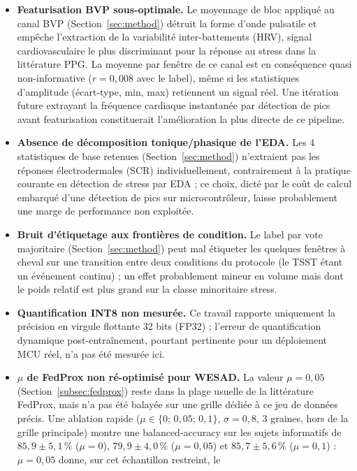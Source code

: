 \documentclass{acmart}
\begin{document}
\begin{itemize}
  \item \textbf{Featurisation BVP sous-optimale.} Le moyennage de bloc
  appliqué au canal BVP (Section~\ref{sec:method}) détruit la forme d'onde
  pulsatile et empêche l'extraction de la variabilité inter-battements
  (HRV), signal cardiovasculaire le plus discriminant pour la réponse au
  stress dans la littérature PPG. La moyenne par fenêtre de ce canal est en
  conséquence quasi non-informative ($r=0{,}008$ avec le label), même si les
  statistiques d'amplitude (écart-type, min, max) retiennent un signal réel.
  Une itération future extrayant la fréquence cardiaque instantanée par
  détection de pics avant featurisation constituerait l'amélioration la
  plus directe de ce pipeline.
  \item \textbf{Absence de décomposition tonique/phasique de l'EDA.} Les 4
  statistiques de base retenues (Section~\ref{sec:method}) n'extraient pas
  les réponses électrodermales (SCR) individuellement, contrairement à la
  pratique courante en détection de stress par EDA ; ce choix, dicté par le
  coût de calcul embarqué d'une détection de pics sur microcontrôleur,
  laisse probablement une marge de performance non exploitée.
  \item \textbf{Bruit d'étiquetage aux frontières de condition.} Le
  label par vote majoritaire (Section~\ref{sec:method}) peut mal étiqueter
  les quelques fenêtres à cheval sur une transition entre deux conditions du
  protocole (le TSST étant un événement continu) ; un effet probablement
  mineur en volume mais dont le poids relatif est plus grand sur la classe
  minoritaire stress.
  \item \textbf{Quantification INT8 non mesurée.} Ce travail rapporte
  uniquement la précision en virgule flottante 32 bits (FP32) ; l'erreur de
  quantification dynamique post-entraînement, pourtant pertinente pour un
  déploiement MCU réel, n'a pas été mesurée ici.
  \item \textbf{$\mu$ de FedProx non ré-optimisé pour WESAD.} La valeur
  $\mu=0{,}05$ (Section~\ref{subsec:fedprox}) reste dans la plage usuelle de
  la littérature FedProx, mais n'a pas été balayée sur une grille dédiée à ce
  jeu de données précis. Une ablation rapide ($\mu \in \{0;\,0{,}05;\,0{,}1\}$,
  $\sigma=0{,}8$, 3 graines, hors de la grille principale) montre une
  balanced-accuracy sur les sujets informatifs de $85{,}9 \pm 5{,}1\,\%$
  ($\mu=0$), $79{,}9 \pm 4{,}0\,\%$ ($\mu=0{,}05$) et $85{,}7 \pm 5{,}6\,\%$
  ($\mu=0{,}1$) : $\mu=0{,}05$ donne, sur cet échantillon restreint, le

\end{itemize}
\end{document}
